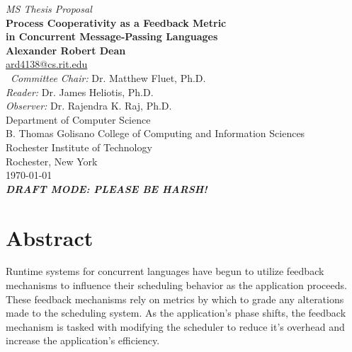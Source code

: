 \thispagestyle{empty} 
\begin{center}
{\em MS Thesis Proposal}\\
\vspace{.5in}
{\huge \bf Process Cooperativity as a Feedback Metric \\
            in Concurrent Message-Passing Languages }\\
\vspace{.5in}
{\bf Alexander Robert Dean}\\
{\footnotesize \url{ard4138@cs.rit.edu}}\\
\vspace{0.25in}
\
{\em Committee Chair:} Dr. Matthew Fluet, Ph.D.\\
\vspace{0.05in}
{\em Reader: } Dr. James Heliotis, Ph.D.\\
\vspace{0.05in}
{\em Observer: } Dr. Rajendra K. Raj, Ph.D.\\
 \vspace{0.20in}
 {\small
Department of Computer Science\\
B. Thomas Golisano College of Computing and Information Sciences \\
Rochester Institute of Technology \\
Rochester, New York }\\ [0.3in]
\vspace{0.28in}
\today{}\\
		\vspace{0.25in}
		{\bf\em DRAFT MODE: PLEASE BE HARSH! }\\
\end{center}
\vfill

\newcommand{\etc} {\emph{etc.\/}}
\newcommand{\etal}{\emph{et~al.\/}}
\newcommand{\eg}  {\emph{e.g.\/}}
\newcommand{\ie}  {\emph{i.e.\/}}


\section*{Abstract}
Runtime systems for concurrent languages have begun to utilize feedback mechanisms to influence their
scheduling behavior as the application proceeds. These feedback mechanisms rely on metrics by which to
grade any alterations made to the scheduling system. As the application's phase shifts, the feedback mechanism
is tasked with modifying the scheduler to reduce it's overhead and increase the application's efficiency.

